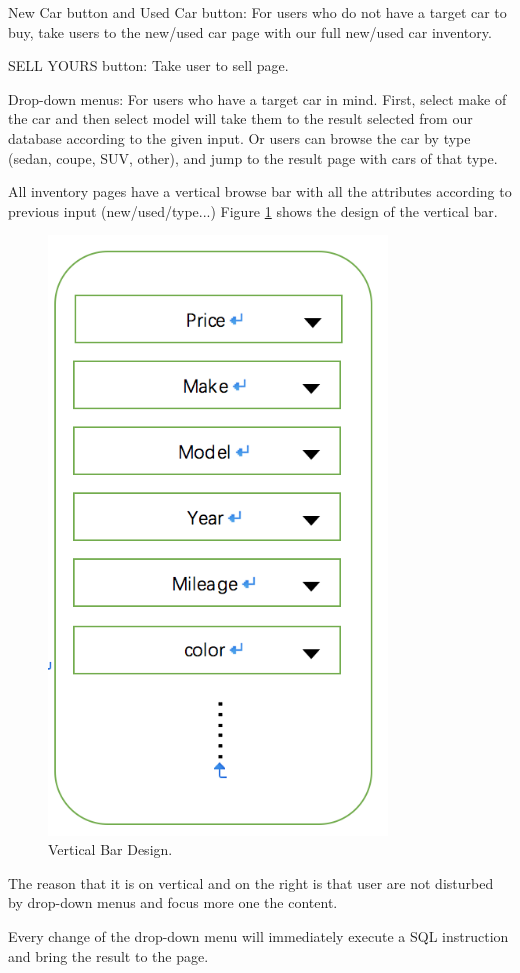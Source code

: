 \documentclass[12pt]{article}
\begin{document}
New Car button and Used Car button: For users who do not have a target car to buy, take users to the new/used car page with our full new/used car inventory.\par
SELL YOURS button: Take user to sell page.\par
Drop-down menus: For users who have a target car in mind. First, select make of the car and then select model will take them to the result selected from our database according to the given input. Or users can browse the car by type (sedan, coupe, SUV, other), and jump to the result page with cars of that type.\par
All inventory pages have a vertical browse bar with all the attributes according to previous input (new/used/type...) Figure \ref{verBar} shows the design of the vertical bar.
\begin{figure}[!h]
\caption{Vertical Bar Design.} \label{verBar}
\begin{center}
\includegraphics[width=9cm]{vertical_bar}
\end{center}
\end{figure}
\par The reason that it is on vertical and on the right is that user are not disturbed by drop-down menus and focus more one the content.\par
Every change of the drop-down menu will immediately execute a SQL instruction and bring the result to the page.
\end{document}
